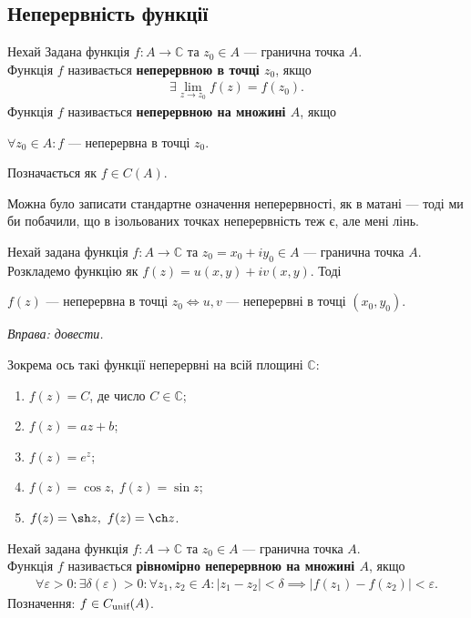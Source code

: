 \documentclass{math_library}
\begin{document}
\subsection{Неперервність функції}
\begin{definition}
Нехай Задана функція $f \colon A \to \mathbb{C}$ та $z_0 \in A$ --- гранична точка $A$.\\
Функція $f$ називається \textbf{неперервною в точці $z_0$}, якщо
\begin{align*}
\exists \lim_{z \to z_0} f(z) = f(z_0).
\end{align*}
Функція $f$ називається \textbf{неперервною на множині $A$}, якщо 
\begin{center}
$\forall z_0 \in A: f$ --- неперервна в точці $z_0$.
\end{center}
Позначається як $f \in C(A)$.
\end{definition}

\begin{remark}
Можна було записати стандартне означення неперервності, як в матані --- тоді ми би побачили, що в ізольованих точках неперервність теж є, але мені лінь.
\end{remark}

\begin{theorem}
Нехай задана функція $f \colon A \to \mathbb{C}$ та $z_0 = x_0 +iy_0 \in A$ --- гранична точка $A$. Розкладемо функцію як $f(z) = u(x,y) + i v(x,y)$. Тоді 
\begin{center}
$f(z)$ --- неперервна в точці $z_0 \iff u,v$ --- неперервні в точці $(x_0,y_0)$.
\end{center}
\textit{Вправа: довести.}
\end{theorem}

\begin{example}
Зокрема ось такі функції неперервні на всій площині $\mathbb{C}$:
\begin{enumerate}[nosep,wide=0pt,label={\arabic*)}]
\item $f(z) = C$, де число $C \in \mathbb{C}$;
\item $f(z) = az+b$;

\item $f(z) = e^z$;
\item $f(z) = \cos z,\ f(z) = \sin z$;
\item $f(z) = \sh z,\ f(z) = \ch z$.
\end{enumerate}
\end{example}

\begin{definition}
Нехай задана функція $f \colon A \to \mathbb{C}$ та $z_0 \in A$ --- гранична точка $A$.\\
Функція $f$ називається \textbf{рівномірно неперервною на множині $A$}, якщо
\begin{align*}
\forall \varepsilon > 0: \exists \delta(\varepsilon) > 0: \forall z_1,z_2 \in A: |z_1-z_2| < \delta \implies |f(z_1)-f(z_2)| < \varepsilon.
\end{align*}
Позначення: $f \in C_{\text{unif}}(A)$.
\end{definition}
\end{document}
